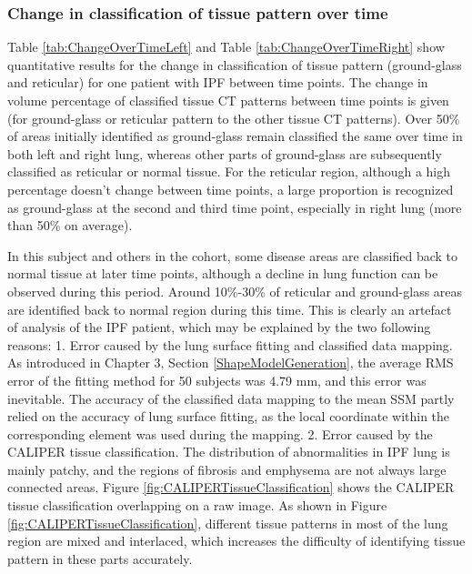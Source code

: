 \subsubsection{Change in classification of tissue pattern over time} \label{TissueClassificationChangeOverTime}
Table \ref{tab:ChangeOverTimeLeft} and Table \ref{tab:ChangeOverTimeRight} show quantitative results for the change in classification of tissue pattern (ground-glass and reticular) for one patient with IPF between time points. The change in volume percentage of classified tissue CT patterns between time points is given (for ground-glass or reticular pattern to the other tissue CT patterns). Over 50\% of areas initially identified as ground-glass remain classified the same over time in both left and right lung, whereas other parts of ground-glass are subsequently classified as reticular or normal tissue. For the reticular region, although a high percentage doesn't change between time points, a large proportion is recognized as ground-glass at the second and third time point, especially in right lung (more than 50\% on average). 

In this subject and others in the cohort, some disease areas are classified back to normal tissue at later time points, although a decline in lung function can be observed during this period. Around 10\%-30\% of reticular and ground-glass areas are identified back to normal region during this time. This is clearly an artefact of analysis of the IPF patient, which may be explained by the two following reasons: 1. Error caused by the lung surface fitting and classified data mapping. As introduced in Chapter 3, Section \ref{ShapeModelGeneration}, the average RMS error of the fitting method for 50 subjects was 4.79 mm, and this error was inevitable. The accuracy of the classified data mapping to the mean SSM partly relied on the accuracy of lung surface fitting, as the local coordinate within the corresponding element was used during the mapping. 2. Error caused by the CALIPER tissue classification. The distribution of abnormalities in IPF lung is mainly patchy, and the regions of fibrosis and emphysema are not always large connected areas. Figure \ref{fig:CALIPERTissueClassification} shows the CALIPER tissue classification overlapping on a raw image. As shown in Figure \ref{fig:CALIPERTissueClassification}, different tissue patterns in most of the lung region are mixed and interlaced, which increases the difficulty of identifying tissue pattern in these parts accurately.

